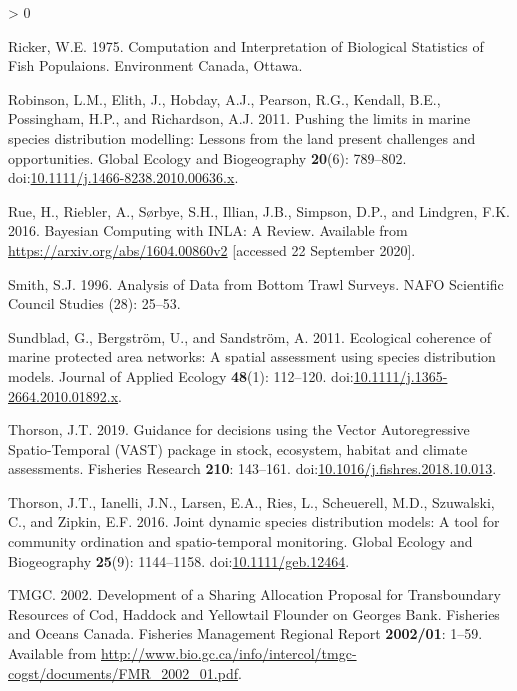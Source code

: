 \documentclass[
]{article}
\newlength{\cslhangindent}
\newenvironment{CSLReferences}[2] %
 {%
  \setlength{\parindent}{0pt}
  \ifodd #1 \everypar{\setlength{\hangindent}{\cslhangindent}}\ignorespaces\fi
  \ifnum #2 > 0
  \setlength{\parskip}{#2\baselineskip}
  \fi
 }%
 {}
\begin{document}
\begin{CSLReferences}{1}{0}
\leavevmode\hypertarget{ref-rickerComputationInterpretationBiological1975}{}%
Ricker, W.E. 1975. Computation and {Interpretation} of {Biological Statistics} of {Fish Populaions}. {Environment Canada}, {Ottawa}.

\leavevmode\hypertarget{ref-robinsonPushingLimitsMarine2011}{}%
Robinson, L.M., Elith, J., Hobday, A.J., Pearson, R.G., Kendall, B.E., Possingham, H.P., and Richardson, A.J. 2011. Pushing the limits in marine species distribution modelling: Lessons from the land present challenges and opportunities. Global Ecology and Biogeography \textbf{20}(6): 789--802. doi:\href{https://doi.org/10.1111/j.1466-8238.2010.00636.x}{10.1111/j.1466-8238.2010.00636.x}.

\leavevmode\hypertarget{ref-rueBayesianComputingINLA2016}{}%
Rue, H., Riebler, A., Sørbye, S.H., Illian, J.B., Simpson, D.P., and Lindgren, F.K. 2016. Bayesian {Computing} with {INLA}: {A Review}. Available from \url{https://arxiv.org/abs/1604.00860v2} {[}accessed 22 September 2020{]}.

\leavevmode\hypertarget{ref-smithAnalysisDataBottom1996}{}%
Smith, S.J. 1996. Analysis of {Data} from {Bottom Trawl Surveys}. NAFO Scientific Council Studies (28): 25--53.

\leavevmode\hypertarget{ref-sundbladEcologicalCoherenceMarine2011}{}%
Sundblad, G., Bergström, U., and Sandström, A. 2011. Ecological coherence of marine protected area networks: A spatial assessment using species distribution models. Journal of Applied Ecology \textbf{48}(1): 112--120. doi:\href{https://doi.org/10.1111/j.1365-2664.2010.01892.x}{10.1111/j.1365-2664.2010.01892.x}.

\leavevmode\hypertarget{ref-thorsonGuidanceDecisionsUsing2019}{}%
Thorson, J.T. 2019. Guidance for decisions using the {Vector Autoregressive Spatio}-{Temporal} ({VAST}) package in stock, ecosystem, habitat and climate assessments. Fisheries Research \textbf{210}: 143--161. doi:\href{https://doi.org/10.1016/j.fishres.2018.10.013}{10.1016/j.fishres.2018.10.013}.

\leavevmode\hypertarget{ref-thorsonJointDynamicSpecies2016}{}%
Thorson, J.T., Ianelli, J.N., Larsen, E.A., Ries, L., Scheuerell, M.D., Szuwalski, C., and Zipkin, E.F. 2016. Joint dynamic species distribution models: A tool for community ordination and spatio-temporal monitoring. Global Ecology and Biogeography \textbf{25}(9): 1144--1158. doi:\href{https://doi.org/10.1111/geb.12464}{10.1111/geb.12464}.

\leavevmode\hypertarget{ref-tmgcDevelopmentSharingAllocation2002}{}%
TMGC. 2002. Development of a {Sharing Allocation Proposal} for {Transboundary Resources} of {Cod}, {Haddock} and {Yellowtail Flounder} on {Georges Bank}. Fisheries and Oceans Canada. Fisheries Management Regional Report \textbf{2002/01}: 1--59. Available from \url{http://www.bio.gc.ca/info/intercol/tmgc-cogst/documents/FMR_2002_01.pdf}.


\end{CSLReferences}
\end{document}
